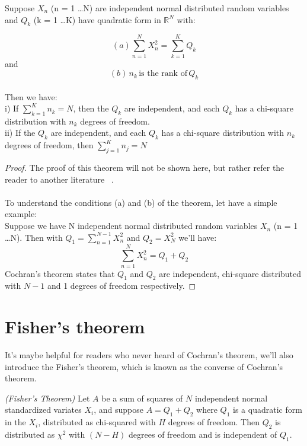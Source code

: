 \begin{mytheo}
Suppose $X_n$ (n = 1 \ldots N) are independent normal distributed random variables and $Q_k$ (k = 1 \ldots K) have quadratic form in $\mathbb{R}^N$ with:

\begin{displaymath}
(a)
\sum_{n=1}^N X_n^2= \sum_{k=1}^K Q_k
\end{displaymath}
and
\begin{displaymath}
(b) \, n_k \, \textrm{is the rank of} \, Q_k
\end{displaymath}
\\
Then we have:
\\
i) If $\sum_{k=1}^K n_k = N$, then the $Q_k$ are independent, and each $Q_k$ has a chi-square distribution with $n_k$ degrees of freedom.
\\
ii) If the $Q_k$ are independent, and each $Q_k$ has a chi-square distribution with $n_k$ degrees of freedom, then $\sum_{j=1}^K n_j = N$
\\

\end{mytheo}

\begin{proof} 
The proof of this theorem will not be shown here, but rather refer the reader to another literature ~\citep{cochran}.
\\
\\
To understand the conditions (a) and (b) of the theorem, let have a simple example:
\\
Suppose we have N independent normal distributed random variables $X_n$ (n = 1 \ldots N). Then with $Q_1 = \sum_{n=1}^{N-1} X_n^2$ and $Q_2 = X_N^2$ we'll have: 
\begin{displaymath}
\sum_{n=1}^N X_n^2 = Q_1 + Q_2
\end{displaymath}
Cochran's theorem states that $Q_1$ and $Q_2$ are independent, chi-square distributed with $N-1$ and 1 degrees of freedom respectively.

\end{proof}
\section{Fisher's theorem}\label{appendixc}
It's maybe helpful for readers who never heard of Cochran's theorem, we'll also introduce the Fisher's theorem, which is known as the converse of Cochran's theorem.\\
\begin{theorem}
\emph{(Fisher's Theorem)}
Let $A$ be a sum of squares of $N$ independent normal standardized variates $X_i$, and suppose $A=Q_1+Q_2$ where $Q_1$ is a quadratic form in the $X_i$, distributed as chi-squared with $H$ degrees of freedom. Then $Q_2$ is distributed as $\chi^2$ with $(N-H)$ degrees of freedom and is independent of $Q_1$.	
\end{theorem}
